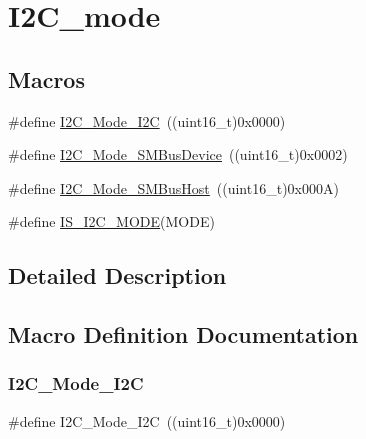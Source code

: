 \hypertarget{group___i2_c__mode}{}\section{I2\+C\+\_\+mode}
\label{group___i2_c__mode}
\subsection*{Macros}
\begin{DoxyCompactItemize}
\item 
\#define \mbox{\hyperlink{group___i2_c__mode_ga8bc3b0555ca31b6f8423bc2ada45d1ac}{I2\+C\+\_\+\+Mode\+\_\+\+I2C}}~((uint16\+\_\+t)0x0000)
\item 
\#define \mbox{\hyperlink{group___i2_c__mode_gaf0cf66bc1f4986ba8a9925da924e06da}{I2\+C\+\_\+\+Mode\+\_\+\+S\+M\+Bus\+Device}}~((uint16\+\_\+t)0x0002)
\item 
\#define \mbox{\hyperlink{group___i2_c__mode_gacfd37619c8d91dea5dec2921840acede}{I2\+C\+\_\+\+Mode\+\_\+\+S\+M\+Bus\+Host}}~((uint16\+\_\+t)0x000\+A)
\item 
\#define \mbox{\hyperlink{group___i2_c__mode_ga58464e1fe94a79bab721137a544baf79}{I\+S\+\_\+\+I2\+C\+\_\+\+M\+O\+DE}}(M\+O\+DE)
\end{DoxyCompactItemize}


\subsection{Detailed Description}


\subsection{Macro Definition Documentation}
\mbox{\label{group___i2_c__mode_ga8bc3b0555ca31b6f8423bc2ada45d1ac}} 
\subsubsection{\texorpdfstring{I2C\_Mode\_I2C}{I2C\_Mode\_I2C}}
{\footnotesize\ttfamily \#define I2\+C\+\_\+\+Mode\+\_\+\+I2C~((uint16\+\_\+t)0x0000)}

\mbox{\label{group___i2_c__mode_gaf0cf66bc1f4986ba8a9925da924e06da}} 
